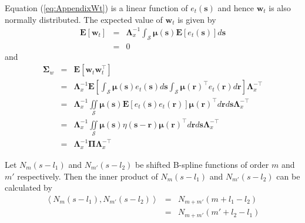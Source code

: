 \documentclass[11pt,draftcls,onecolumn,peerreview]{IEEEtran}
\begin{document}
{{\begin{lemma}
\label{lemma:FieldCovariance}
\end{lemma}
\begin{IEEEproof}
 Equation (\ref{eq:AppendixWt}) is a linear function of $e_t(\mathbf s)$ and hence $\mathbf{w}_t$ is also normally distributed. The expected value of $\mathbf w_t$ is given by 
\begin{eqnarray}
 \mathbf E\left[ \mathbf w_t\right]&=& \mathbf{\Lambda}_{x}^{-1}\int_{\mathcal{S}}\boldsymbol\mu \left(\mathbf{s}\right)\mathbf E\left[e_t\left(\mathbf{s}\right)\right] d\mathbf{s} \nonumber \\
&=&0
\end{eqnarray}
and 
\begin{eqnarray}
\mathbf \Sigma_w&{}={}&\mathbf E[ \mathbf w_t \mathbf w_{t}^{\top}]\nonumber\\
&=& \mathbf{\Lambda}_{x}^{-1}\mathbf E[\int_{\mathcal{S}}\boldsymbol\mu\left(\mathbf s\right)e_t\left(\mathbf s\right)d\mathbf s\int_{\mathcal{S}}\boldsymbol\mu\left(\mathbf r\right)^{\top}e_t\left(\mathbf r\right)d\mathbf r]\mathbf{\Lambda}_{x}^{- \top} \nonumber \\
&=&\mathbf{\Lambda}_{x}^{-1}\iint\limits_{\mathcal{S}}\boldsymbol\mu\left(\mathbf s\right) \mathbf E[e_t\left(\mathbf s\right)e_t\left(\mathbf r\right)]\boldsymbol\mu\left(\mathbf r\right)^{\top}d\mathbf r d\mathbf s\mathbf{\Lambda}_{x}^{- \top} \nonumber\\
&=&{}\mathbf{\Lambda}_{x}^{-1}\iint\limits_{\mathcal{S}}\boldsymbol\mu\left(\mathbf s\right) \eta\left(\mathbf s- \mathbf r \right)\boldsymbol\mu\left(\mathbf r\right)^{\top}d\mathbf r d\mathbf s\mathbf{\Lambda}_{x}^{- \top} \nonumber\\
&=&\mathbf{\Lambda}_{x}^{-1}\boldsymbol\Pi\mathbf{\Lambda}_{x}^{- \top}
\end{eqnarray}
\setlength{\arraycolsep}{5pt}
\end{IEEEproof}
\begin{lemma}
Let $N_m\left(s-l_1\right)$ and $N_{m'}\left(s-l_2\right)$ be shifted B-spline functions of order $m$ and $m'$ respectively. Then the inner product of  $N_m\left(s-l_1\right)$  and $N_{m'}\left(s-l_2\right)$ can be calculated by 
\setlength{\arraycolsep}{0.0em}
\begin{eqnarray}
\left\langle N_{m}\left(s-l_{1}\right), N_{m'}\left(s-l_{2}\right)\right\rangle&=&N_{m+m'}\left(m+l_{1}-l_{2}\right) \nonumber \\
&=&N_{m+m'}\left(m'+l_{2}-l_{1}\right) 
\end{eqnarray}
\setlength{\arraycolsep}{5pt}

\end{lemma}}}
\end{document}
